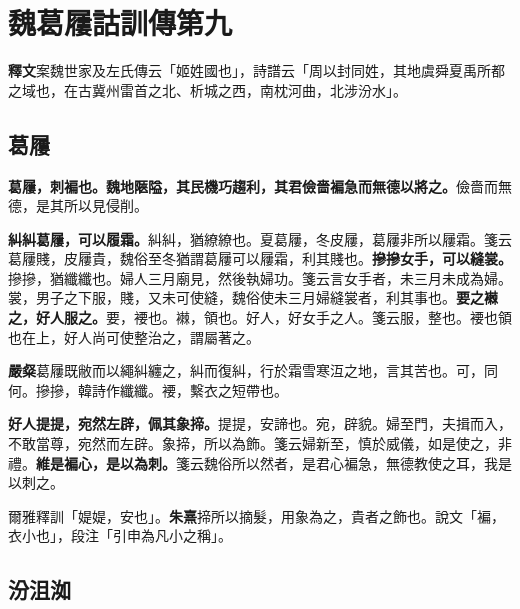 \chapter{魏葛屨詁訓傳第九}

\begin{quoting}\textbf{釋文}案魏世家及左氏傳云「姬姓國也」，詩譜云「周以封同姓，其地虞舜夏禹所都之域也，在古冀州雷首之北、析城之西，南枕河曲，北涉汾水」。\end{quoting}

\section{葛屨}


\textbf{葛屨，刺褊也。魏地陿隘，其民機巧趨利，其君儉嗇褊急而無德以將之。}{\footnotesize 儉嗇而無德，是其所以見侵削。}

\textbf{糾糾葛屨，可以履霜。}{\footnotesize 糾糾，猶繚繚也。夏葛屨，冬皮屨，葛屨非所以屨霜。箋云葛屨賤，皮屨貴，魏俗至冬猶謂葛屨可以屨霜，利其賤也。}\textbf{摻摻女手，可以縫裳。}{\footnotesize 摻摻，猶纖纖也。婦人三月廟見，然後執婦功。箋云言女手者，未三月未成為婦。裳，男子之下服，賤，又未可使縫，魏俗使未三月婦縫裳者，利其事也。}\textbf{要之襋之，好人服之。}{\footnotesize 要，䙅也。襋，領也。好人，好女手之人。箋云服，整也。䙅也領也在上，好人尚可使整治之，謂屬著之。}

\begin{quoting}\textbf{嚴粲}葛屨既敝而以繩糾纏之，糾而復糾，行於霜雪寒沍之地，言其苦也。可，同何。摻摻，韓詩作纖纖。䙅，繫衣之短帶也。\end{quoting}

\textbf{好人提提，宛然左辟，佩其象揥。}{\footnotesize 提提，安諦也。宛，辟貌。婦至門，夫揖而入，不敢當尊，宛然而左辟。象揥，所以為飾。箋云婦新至，慎於威儀，如是使之，非禮。}\textbf{維是褊心，是以為刺。}{\footnotesize 箋云魏俗所以然者，是君心褊急，無德教使之耳，我是以刺之。}

\begin{quoting}爾雅釋訓「媞媞，安也」。\textbf{朱熹}揥所以摘髮，用象為之，貴者之飾也。說文「褊，衣小也」，段注「引申為凡小之稱」。\end{quoting}

\section{汾沮洳}


